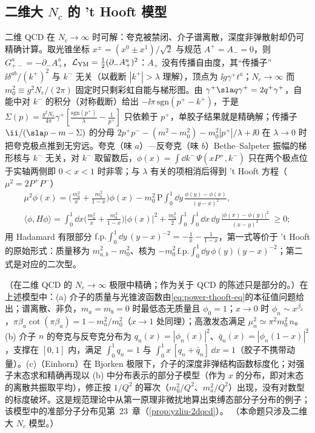 \subsection{二维大 \texorpdfstring{$N_c$}{Nc} 的 't Hooft 模型}

二维 QCD 在 $N_c\to\infty$ 时可解\cite{tHooft1974}：夸克被禁闭、介子谱离散，深度非弹散射却仍可精确计算。取光锥坐标 $x^\pm=(x^0\pm x^1)/\sqrt2$ 与规范 $A^+=A_-=0$，则 $G^a_{+-}=-\partial_-A^a_+$，$\mathcal L_{\rm YM}=\frac12(\partial_-A^a_+)^2$：$A_+$ 没有传播自由度，其“传播子” $\ii\delta^{ab}/(k^+)^2$ 与 $k^-$ 无关（以截断 $|k^+|>\lambda$ 理解），顶点为 $\ii g\gamma^+t^a$；$N_c\to\infty$ 而 $m_0^2\equiv g^2N_c/(2\pi)$ 固定时只剩彩虹自能与梯形图。由 $\gamma^+\sla q\gamma^+=2q^+\gamma^+$，自能中对 $k^-$ 的积分（对称截断）给出 $-\ii\pi\,\mathrm{sgn}(p^+-k^+)$，于是 $\Sigma(p)=\frac{g^2N_c}{4\pi}\gamma^+[\frac{\mathrm{sgn}(p^+)}{\lambda}-\frac{1}{p^+}]$ 只依赖于 $p^+$，单胶子结果就是精确解；传播子 $\ii/(\sla p-m-\Sigma)$ 的分母 $2p^+p^--(m^2-m_0^2)-m_0^2|p^+|/\lambda+\ii0$ 在 $\lambda\to0$ 时把夸克极点推到无穷远。夸克（味 $a$）—反夸克（味 $b$）Bethe--Salpeter 振幅的梯形核与 $k^-$ 无关，对 $k^-$ 取留数后，$\phi(x)=\int\dd k^-\,\Psi(xP^+,k^-)$ 只在两个极点位于实轴两侧即 $0<x<1$ 时非零；与 $\lambda$ 有关的项相消后得到 't Hooft 方程\cite{tHooft1974}（$\mu^2=2P^+P^-$）
\begin{gather}
\mu^2\phi(x)=\Big(\frac{m_a^2}{x}+\frac{m_b^2}{1-x}\Big)\phi(x)-m_0^2\,\mathrm{P}\!\!\int_0^1\!\dd y\,\frac{\phi(y)-\phi(x)}{(y-x)^2},\label{eq:power-thooft-eq}\\
\langle\phi,H\phi\rangle=\int_0^1\!\dd x\Big(\frac{m_a^2}{x}+\frac{m_b^2}{1-x}\Big)|\phi(x)|^2+\frac{m_0^2}{2}\int_0^1\!\!\int_0^1\!\dd x\,\dd y\,\frac{|\phi(x)-\phi(y)|^2}{(x-y)^2}\;\ge0 ;\label{eq:power-thooft-form}
\end{gather}
用 Hadamard 有限部分 $\mathrm{f.p.}\int_0^1\dd y\,(y-x)^{-2}=-\frac1x-\frac1{1-x}$，第一式等价于 't Hooft 的原始形式：质量移为 $m_{a,b}^2-m_0^2$、核为 $-m_0^2\,\mathrm{f.p.}\int_0^1\dd y\,\phi(y)(y-x)^{-2}$；第二式是对应的二次型。

\begin{proposition}\label{prop:power-thooft-model}
（在二维 QCD 的 $N_c\to\infty$ 极限中精确；作为关于 QCD 的陈述只是部分的。）在上述模型中：(a) 介子的质量与光锥波函数由\eqref{eq:power-thooft-eq}的本征值问题给出；谱离散、非负，$m_a=m_b=0$ 时最低态无质量且 $\phi_0=1$；$x\to0$ 时 $\phi_n\sim x^{\beta_a}$，$\pi\beta_a\cot(\pi\beta_a)=1-m_a^2/m_0^2$（$x\to1$ 处同理）；高激发态满足 $\mu_n^2\simeq\pi^2m_0^2\,n$。(b) 介子 $n$ 的夸克与反夸克分布为 $q_n(x)=|\phi_n(x)|^2$、$\bar q_n(x)=|\phi_n(1-x)|^2$，支撑在 $[0,1]$ 内，满足 $\int_0^1q_n=1$ 与 $\int_0^1x\,[q_n+\bar q_n]\,\dd x=1$（胶子不携带动量）。(c)（Einhorn\cite{Einhorn1976}）在 Bjorken 极限下，介子的深度非弹结构函数标度化；对强子末态求和精确再现以 (b) 中分布表示的部分子模型（作为 $x$ 的分布，即对末态的离散共振取平均），修正按 $1/Q^2$ 的幂次（$m_0^2/Q^2$、$m_a^2/Q^2$）出现，没有对数型的标度破坏。这是规范理论中从第一原理非微扰地算出束缚态部分子分布的例子；该模型中的准部分子分布见第~23~章（\cref{prop:yzliu-2dqcd}）。
（本命题只涉及二维大 $N_c$ 模型。）
\end{proposition}

